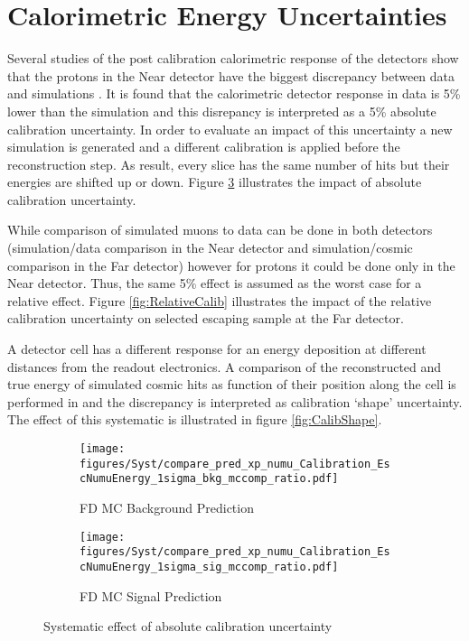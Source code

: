 \section{Calorimetric Energy Uncertainties}
Several studies of the post calibration calorimetric response of the detectors show that the protons in the Near detector
have the biggest discrepancy between data and simulations \cite{ecalib_talk}. It is found that the calorimetric detector
response in data is 5\% lower than the simulation and this disrepancy is interpreted as a 5\% absolute calibration
uncertainty. In order to evaluate an impact of this uncertainty a new simulation is generated and a different calibration
is applied before the reconstruction step. As result, every slice has the same number of hits but their energies are 
shifted up or down. Figure \ref{fig:Calibration} illustrates the impact of absolute calibration uncertainty.

While comparison of simulated muons to data can be done in both detectors (simulation/data comparison in the Near detector 
and simulation/cosmic comparison in the Far detector) however for protons it could be done only in the Near detector.  
Thus, the same 5\% effect is assumed as the worst case for a relative effect. Figure \ref{fig:RelativeCalib} illustrates 
the impact of the relative calibration uncertainty on selected escaping sample at the Far detector. 

A detector cell has a different response for an energy deposition at different distances from the readout electronics. 
A comparison of the reconstructed and true energy of simulated cosmic hits as function of their position along the cell 
is performed in \cite{shape_talk} and the discrepancy is interpreted as calibration `shape' uncertainty. The effect of this 
systematic is illustrated in figure \ref{fig:CalibShape}.  

\clearpage
\begin{figure}[t!]
\begin{subfigure}[t]{0.5\textwidth}
  \centering
  \texttt{[image: figures/Syst/compare\_pred\_xp\_numu\_Calibration\_EscNumuEnergy\_1sigma\_bkg\_mccomp\_ratio.pdf]}
  \caption{FD MC Background Prediction}
  \label{fig:bkg_Calibration}
\end{subfigure}%
\begin{subfigure}[t]{0.5\textwidth}
  \centering
  \texttt{[image: figures/Syst/compare\_pred\_xp\_numu\_Calibration\_EscNumuEnergy\_1sigma\_sig\_mccomp\_ratio.pdf]}
  \caption{FD MC Signal Prediction}
  \label{fig:sig_Calibration}
\end{subfigure}
\caption{ Systematic effect of absolute calibration uncertainty }
\label{fig:Calibration}
\end{figure}

